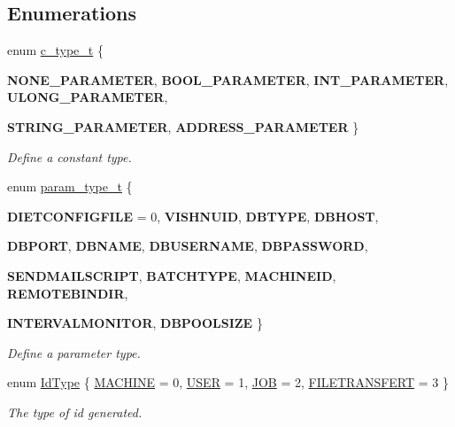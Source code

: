 \subsection*{Enumerations}
\begin{DoxyCompactItemize}
\item 
enum \hyperlink{namespacevishnu_ad8abe82f8ea57792411b26b9ed15287e}{c\_\-type\_\-t} \{ \par
{\bfseries NONE\_\-PARAMETER}, 
{\bfseries BOOL\_\-PARAMETER}, 
{\bfseries INT\_\-PARAMETER}, 
{\bfseries ULONG\_\-PARAMETER}, 
\par
{\bfseries STRING\_\-PARAMETER}, 
{\bfseries ADDRESS\_\-PARAMETER}
 \}
\begin{DoxyCompactList}\small\item\em Define a constant type. \item\end{DoxyCompactList}\item 
enum \hyperlink{namespacevishnu_afa06c1bb0b3442d83acb7650e8df75d1}{param\_\-type\_\-t} \{ \par
{\bfseries DIETCONFIGFILE} = 0, 
{\bfseries VISHNUID}, 
{\bfseries DBTYPE}, 
{\bfseries DBHOST}, 
\par
{\bfseries DBPORT}, 
{\bfseries DBNAME}, 
{\bfseries DBUSERNAME}, 
{\bfseries DBPASSWORD}, 
\par
{\bfseries SENDMAILSCRIPT}, 
{\bfseries BATCHTYPE}, 
{\bfseries MACHINEID}, 
{\bfseries REMOTEBINDIR}, 
\par
{\bfseries INTERVALMONITOR}, 
{\bfseries DBPOOLSIZE}
 \}
\begin{DoxyCompactList}\small\item\em Define a parameter type. \item\end{DoxyCompactList}\item 
enum \hyperlink{namespacevishnu_aff8a694c2bc2b55465a31b4bf00f58c1}{IdType} \{ \hyperlink{namespacevishnu_aff8a694c2bc2b55465a31b4bf00f58c1a18985dc599467035432920df9bcb2e8b}{MACHINE} =  0, 
\hyperlink{namespacevishnu_aff8a694c2bc2b55465a31b4bf00f58c1ae057d74230de0c43ca6fae4c80cd2898}{USER} =  1, 
\hyperlink{namespacevishnu_aff8a694c2bc2b55465a31b4bf00f58c1ac6a371f14311f16f9f476b7db284ac4f}{JOB} =  2, 
\hyperlink{namespacevishnu_aff8a694c2bc2b55465a31b4bf00f58c1afb06f51582220be5d9536a855abf0ae0}{FILETRANSFERT} =  3
 \}
\begin{DoxyCompactList}\small\item\em The type of id generated. \item\end{DoxyCompactList}\item 

\end{DoxyCompactItemize}

